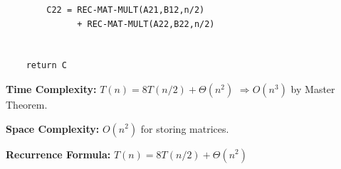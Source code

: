 \documentclass[a4paper,12pt]{article}
\begin{document}
\begin{tcolorbox}[
    colback=gray!30,
    colframe=black,
    boxrule=1pt,
    arc=0mm
]
\begin{tcolorbox}[
    colback=black!5,
    colframe=black,
    arc=0mm,
    title=Pseudo-code
]
\begin{lstlisting}
        C22 = REC-MAT-MULT(A21,B12,n/2)
              + REC-MAT-MULT(A22,B22,n/2)


    return C
\end{lstlisting}
\end{tcolorbox}


\begin{tcolorbox}[
    colback=cyan!20,
    colframe=black,
    arc=0mm
]
\small
\textbf{Time Complexity:}
$T(n)=8T(n/2)+\Theta(n^2)$
$\Rightarrow O(n^3)$ by Master Theorem.
\end{tcolorbox}


\begin{tcolorbox}[
    colback=violet!20,
    colframe=black,
    arc=0mm
]
\small
\textbf{Space Complexity:}
$O(n^2)$ for storing matrices.
\end{tcolorbox}


\begin{tcolorbox}[
    colback=pink!20,
    colframe=black,
    arc=0mm
]
\small
\textbf{Recurrence Formula:}
$T(n)=8T(n/2)+\Theta(n^2)$
\end{tcolorbox}

\end{tcolorbox}
\end{document}
